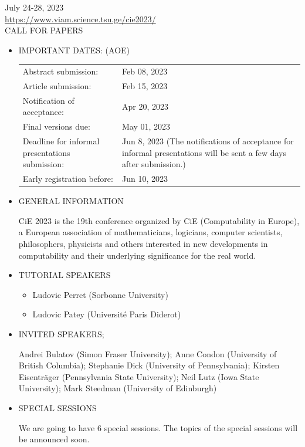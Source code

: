 \documentclass[prodmode,acmtecs]{acmsmall} %
\begin{document}
  July 24-28, 2023\\ 
  \href{https://www.viam.science.tsu.ge/cie2023/}{https://www.viam.science.tsu.ge/cie2023/}\\ 
CALL FOR PAPERS 

\begin{itemize}\item  IMPORTANT DATES: (AOE) 
 
\begin{tabulary}{\linewidth}{LL}Abstract submission:  & Feb 08, 2023 \\
Article submission:  & Feb 15, 2023 \\
Notification of acceptance:  & Apr 20, 2023 \\
Final versions due:  & May 01, 2023 \\
Deadline for informal presentations submission:  & Jun 8, 2023 (The notifications of acceptance for informal presentations will be sent a few days after submission.) \\
Early registration before:  & Jun 10, 2023 \\
\end{tabulary}
 
\item  GENERAL INFORMATION 
 
  CiE 2023 is the 19th conference organized by CiE (Computability in Europe), a European association of mathematicians, logicians, computer scientists, philosophers, physicists and others interested in new developments in computability and their underlying significance for the real world. 
 
\item  TUTORIAL SPEAKERS 
 
\begin{itemize}\item  Ludovic Perret (Sorbonne University)
\item  Ludovic Patey (Université Paris Diderot)
\end{itemize} 
\item  INVITED SPEAKERS;  
 
  Andrei Bulatov (Simon Fraser University); Anne Condon (University of British Columbia); Stephanie Dick (University of Pennsylvania); Kirsten Eisenträger (Pennsylvania State University); Neil Lutz (Iowa State University); Mark Steedman (University of Edinburgh) 
 
\item  SPECIAL SESSIONS 
 
  We are going to have 6 special sessions. The topics of the special sessions will be announced soon. 
 

\end{itemize}
\end{document}
